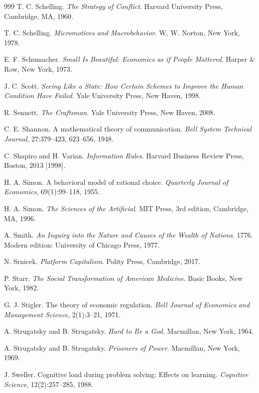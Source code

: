 \documentclass[11pt]{article}
\begin{document}
\begin{thebibliography}{999}
T. C. Schelling.
\textit{The Strategy of Conflict}.
Harvard University Press, Cambridge, MA, 1960.

T. C. Schelling.
\textit{Micromotives and Macrobehavior}.
W. W. Norton, New York, 1978.

E. F. Schumacher.
\textit{Small Is Beautiful: Economics as if People Mattered}.
Harper \& Row, New York, 1973.

J. C. Scott.
\textit{Seeing Like a State: How Certain Schemes to Improve the Human Condition Have Failed}.
Yale University Press, New Haven, 1998.

R. Sennett.
\textit{The Craftsman}.
Yale University Press, New Haven, 2008.

C. E. Shannon.
A mathematical theory of communication.
\textit{Bell System Technical Journal}, 27:379--423, 623--656, 1948.

C. Shapiro and H. Varian.
\textit{Information Rules}.
Harvard Business Review Press, Boston, 2013 [1998].

H. A. Simon.
A behavioral model of rational choice.
\textit{Quarterly Journal of Economics}, 69(1):99--118, 1955.

H. A. Simon.
\textit{The Sciences of the Artificial}.
MIT Press, 3rd edition, Cambridge, MA, 1996.

A. Smith.
\textit{An Inquiry into the Nature and Causes of the Wealth of Nations}.
1776. Modern edition: University of Chicago Press, 1977.

N. Srnicek.
\textit{Platform Capitalism}.
Polity Press, Cambridge, 2017.

P. Starr.
\textit{The Social Transformation of American Medicine}.
Basic Books, New York, 1982.

G. J. Stigler.
The theory of economic regulation.
\textit{Bell Journal of Economics and Management Science}, 2(1):3--21, 1971.

A. Strugatsky and B. Strugatsky.
\textit{Hard to Be a God}.
Macmillan, New York, 1964.

A. Strugatsky and B. Strugatsky.
\textit{Prisoners of Power}.
Macmillan, New York, 1969.

J. Sweller.
Cognitive load during problem solving: Effects on learning.
\textit{Cognitive Science}, 12(2):257--285, 1988.


\end{thebibliography}
\end{document}
